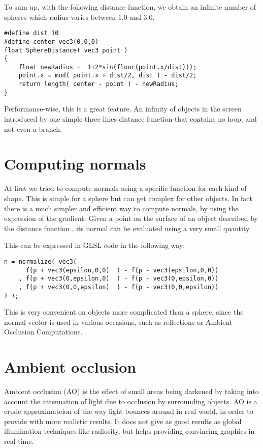 To sum up, with the following distance function, we obtain an infinite number
of spheres which radius varies between $1.0$ and $3.0$. 

\begin{lstlisting}
#define dist 10
#define center vec3(0,0,0)
float SphereDistance( vec3 point )
{
    float newRadius =  1+2*sin(floor(point.x/dist)));
    point.x = mod( point.x + dist/2, dist ) - dist/2;
    return length( center - point ) - newRadius;
}
\end{lstlisting}

Performance-wise, this is a great feature. An infinity of objects in the screen introduced by
one simple three lines distance function that contains no loop, and not even a branch.  


\section{Computing normals}

At first we tried to compute normals using a specific function for each kind of
shape. This is simple for a sphere but can get complex for other objects.
In fact there is a much simpler and efficient way to compute normals, by using
the expression of the gradient:
Given a point  on the surface of an object
described by the distance function , its normal  can be evaluated using a very
small  quantity.

This can be expressed in GLSL code in the following way:

\begin{lstlisting}
n = normalize( vec3(
      f(p + vec3(epsilon,0,0)  ) - f(p - vec3(epsilon,0,0))
    , f(p + vec3(0,epsilon,0)  ) - f(p - vec3(0,epsilon,0))
    , f(p + vec3(0,0,epsilon)  ) - f(p - vec3(0,0,epsilon))
) );
\end{lstlisting}

This is very convenient on objects more complicated than a sphere, since
the normal vector is used in various occasions, such as reflections or Ambient
Occlusion Computations.

\section{Ambient occlusion}

Ambient occlusion (AO) is the effect of small areas being darkened by taking into
account the attenuation of light due to occlusion by surrounding objects.
AO is a crude approximateion of the way light bounces around in real world, in
order to provide with more realistic results. It does not give as good results as
global illumination techniques like radiosity, but helps providing convincing graphics
in real time.

